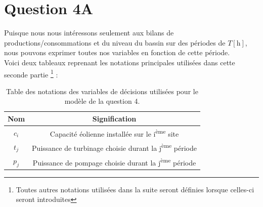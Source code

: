 \documentclass{article}
\newcommand{\unit}[1]{[\mathrm{#1}]}
\begin{document}
\section*{Question 4A}
Puisque nous nous intéressons seulement aux bilans de productions/consommations et du niveau du bassin
sur des périodes de $T \unit{h}$, nous pouvons exprimer toutes nos variables en fonction de cette période.\\
Voici deux tableaux reprenant les notations principales utilisées dans cette seconde partie \footnote{Toutes autres notations utilisées dans la suite seront définies lorsque celles-ci seront introduites} : 

\begin{table}[h!]
    \centering
    \renewcommand{\arraystretch}{1.5}%
    \begin{tabular}{|c || c |} 
        \hline
        Nom & Signification\\
        \hline\hline
        $c_i$ & Capacité éolienne installée sur le i\textsuperscript{ème} site\\
        $t_j$ & Puissance de turbinage choisie durant la j\textsuperscript{ème} période\\
        $p_j$ & Puissance de pompage choisie durant la j\textsuperscript{ème} période\\
        \hline
    \end{tabular}
    \caption{Table des notations des variables de décisions utilisées pour le modèle de la question 4.}
    \label{table:notations_variables_4}
\end{table}
\end{document}
